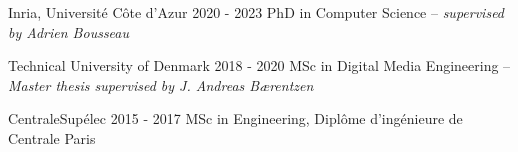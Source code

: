 

\begin{cventries}


  \cventry
    {Inria, Université Côte d'Azur} %
    {2020 - 2023} %
    {PhD in Computer Science -- \textit{supervised by Adrien Bousseau}} 

  \cventry
    {Technical University of Denmark} %
    {2018 - 2020} %
  	{MSc in Digital Media Engineering -- \textit{Master thesis supervised by J. Andreas Bærentzen}} %
    
 
 \cventry
    {CentraleSupélec} %
    {2015 - 2017} %
    {
    MSc in Engineering, Diplôme d'ingénieure de Centrale Paris %
    }
    
    

\end{cventries}
